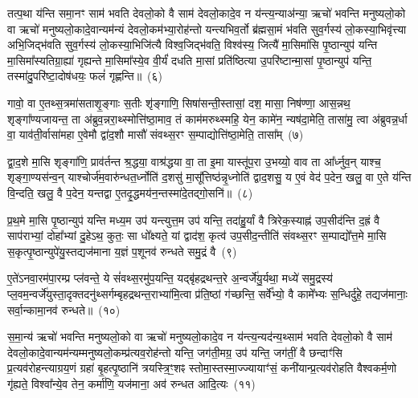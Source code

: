 {%
तत्प॒था य॑न्ति समा॒नꣳ साम॑ भवति देवलो॒को वै साम॑ देवलो॒कादे॒व न य॑न्त्य॒न्याअ॑न्या॒ ऋचो॑ भवन्ति मनुष्यलो॒को वा ऋचो॑ मनुष्यलो॒कादे॒वान्यम॑न्यं देवलो॒कम॑भ्या॒रोह॑न्तो यन्त्यभिव॒र्तो ब्र॑ह्मसा॒मं भ॑वति सुव॒र्गस्य॑ लो॒कस्या॒भिवृ॑त्त्या अभि॒जिद्भ॑वति सुव॒र्गस्य॑ लो॒कस्या॒भिजि॑त्यै विश्व॒जिद्भ॑वति॒ विश्व॑स्य॒ जित्यै॑ मा॒सिमा॑सि पृ॒ष्ठान्युप॑ यन्ति मा॒सिमा᳚स्यतिग्रा॒ह्या॑ गृह्यन्ते मा॒सिमा᳚स्ये॒व वी॒र्यं॑ दधति मा॒सां प्रति॑ष्ठित्या उ॒परि॑ष्टान्मा॒सां पृ॒ष्ठान्युप॑ यन्ति॒ तस्मा॑दु॒परि॑ष्टा॒दोष॑धयः॒ फलं॑ गृह्णन्ति॥~(६)

{\anuvakamend[{गो॒स॒त्रं वा ए॑ति संवथ्स॒रो᳚\-ऽर्धमा॒सा मि॑थु॒नम्म॑ध्य॒तो दे॑व॒याने॑नै॒व वी॒र्य॑न्त्रयो॑दश च}]}%

गावो॒ वा ए॒तथ्स॒त्रमा॑सताशृ॒ङ्गाः स॒तीः शृ॑ङ्गाणि॒ सिषा॑सन्ती॒स्तासां॒ दश॒ मासा॒ निष॑ण्णा॒ आस॒न्नथ॒ शृङ्गा᳚ण्यजायन्त॒ ता अ॑ब्रुव॒न्नरा॒थ्स्मोत्ति॑ष्ठा॒माव॒ तं काम॑मरुथ्स्महि॒ येन॒ कामे॑न॒ न्यष॑दा॒मेति॒ तासा॑मु॒ त्वा अ॑ब्रुवन्न॒र्धा वा॒ याव॑ती॒र्वासा॑महा ए॒वेमौ द्वा॑द॒शौ मासौ॑ संवथ्स॒रꣳ स॒म्पाद्योत्ति॑ष्ठा॒मेति॒ तासा᳚म्~(७)

द्वा॒द॒शे मा॒सि शृङ्गा॑णि॒ प्राव॑र्तन्त श्र॒द्धया॒ वाश्र॑द्धया वा॒ ता इ॒मा यास्तू॑प॒रा उ॒भय्यो॒ वाव ता आ᳚र्ध्नुव॒न् याश्च॒ शृङ्गा॒ण्यस॑न्व॒न् याश्चोर्ज॑म॒वारु॑न्धत॒र्ध्नोति॑ द॒शसु॑ मा॒सू᳚त्तिष्ठ॑न्नृ॒ध्नोति॑ द्वाद॒शसु॒ य ए॒वं वेद॑ प॒देन॒ खलु॒ वा ए॒ते य॑न्ति वि॒न्दति॒ खलु॒ वै प॒देन॒ यन्तद्वा ए॒तदृ॒द्धमय॑न॒न्तस्मा॑दे॒तद्गो॒सनि॑॥~(८)

{\anuvakamend[{ति॒ष्ठा॒मेति॒ तासा॒न्तस्मा॒द्द्वे च॑}]}%

प्र॒थ॒मे मा॒सि पृ॒ष्ठान्युप॑ यन्ति मध्य॒म उप॑ यन्त्युत्त॒म उप॑ यन्ति॒ तदा॑हु॒र्यां वै त्रिरेक॒स्याह्न॑ उप॒सीद॑न्ति द॒ह्रं वै साप॑राभ्यां॒ दोहा᳚भ्यां दु॒हे\-ऽथ॒ कुतः॒ सा धो᳚क्ष्यते॒ यां द्वाद॑श॒ कृत्व॑ उप॒सीद॒न्तीति॑ संवथ्स॒रꣳ स॒म्पाद्यो᳚त्त॒मे मा॒सि स॒कृत्पृ॒ष्ठान्युपे॑यु॒स्तद्यज॑माना य॒ज्ञं प॒शूनव॑ रुन्धते समु॒द्रं वै~(९)

ए॒ते॑\-ऽनवा॒रम॑पा॒रम्प्र प्ल॑वन्ते॒ ये सं॑वथ्स॒रमु॑प॒यन्ति॒ यद्बृ॑हद्रथन्त॒रे अ॒न्वर्जे॑यु॒र्यथा॒ मध्ये॑ समु॒द्रस्य॑ प्ल॒वम॒न्वर्जे॑युस्ता॒दृक्त\-दनु॑थ्सर्गम्बृहद्रथन्त॒राभ्या॑मि॒त्वा प्र॑ति॒ष्ठां ग॑च्छन्ति॒ सर्वे᳚भ्यो॒ वै कामे᳚भ्यः स॒न्धिर्दु॑हे॒ तद्यज॑मानाः॒ सर्वा॒न्कामा॒नव॑ रुन्धते॥~(१०)

{\anuvakamend[{स॒मु॒द्रं वै चतु॑स्त्रिꣳशच्च}]}%

स॒मा॒न्य॑ ऋचो॑ भवन्ति मनुष्यलो॒को वा ऋचो॑ मनुष्यलो॒कादे॒व न य॑न्त्य॒न्यद॑न्य॒थ्साम॑ भवति देवलो॒को वै साम॑ देवलो॒कादे॒वान्यम॑न्यम्मनुष्यलो॒कम्प्र॑त्यव॒रोह॑न्तो यन्ति॒ जग॑ती॒मग्र॒ उप॑ यन्ति॒ जग॑तीं॒ वै छन्दाꣳ॑सि प्र॒त्यव॑रोहन्त्याग्रय॒णं ग्रहा॑ बृ॒हत्पृ॒ष्ठानि॑ त्रयस्त्रि॒ꣳ॒शꣴ स्तोमा॒स्तस्मा॒ज्ज्यायाꣳ॑सं॒ कनी॑यान्प्र॒त्यव॑रोहति वैश्वकर्म॒णो गृ॑ह्यते॒ विश्वा᳚न्ये॒व तेन॒ कर्मा॑णि॒ यज॑माना॒ अव॑ रुन्धत आदि॒त्यः~(११)

}

